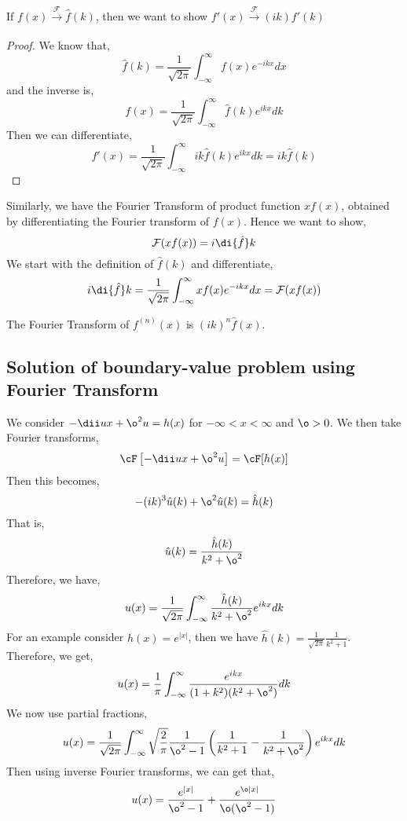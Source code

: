 \begin{nthm}[]
  If $f(x) \xrightarrow[]{\mathcal{F}} \hat f(k)$, then we want to show $f'(x) \xrightarrow[]{\mathcal{F}} (ik)f'(k)$
\end{nthm}
\begin{proof}
  We know that,
  $$ \hat f(k) = \frac{1}{\sqrt{2\pi}}\int_{-\infty}^\infty f(x)e^{-ikx}dx $$
  and the inverse is,
  $$ f(x) = \frac{1}{\sqrt{2\pi}}\int_{-\infty}^\infty \hat f(k)e^{ikx}dk $$
  Then we can differentiate,
  $$ f'(x) = \frac{1}{\sqrt{2\pi}}\int_{-\infty}^\infty  ik\hat f(k)e^{ikx}dk = ik\hat f(k)$$
\end{proof}

\noindent
Similarly, we have the Fourier Transform of product function $xf(x)$, obtained by differentiating the Fourier transform of $f(x)$. Hence we want to show,
$$ \mathcal{F}(xf(x)) = i \di {\hat f} k $$
We start with the definition of $\hat f(k)$ and differentiate,
$$ i\di {\hat f} k = \frac{1}{\sqrt{2\pi}}\int_{-\infty}^\infty xf(x)e^{-ikx}dx = \mathcal{F}(xf(x)) $$
\begin{ncor}
   The Fourier Transform of $f^{(n)}(x)$ is $(ik)^n \hat f(x)$.
\end{ncor}

\subsection{Solution of boundary-value problem using Fourier Transform}
We consider $-\dii u x + \o^2 u = h(x)$ for $-\infty < x < \infty$ and $\o > 0$. We then take Fourier transforms,
$$ \cF \left[ -\dii u x + \o^2 u \right] = \cF [h(x)] $$
Then this becomes,
$$ -(ik)^3\hat u(k) + \o^2\hat u(k) = \hat h(k) $$
That is,
$$ \hat u(k) = \frac{\hat h (k)}{k^2 + \o^2} $$
Therefore, we have,
$$ u(x) = \frac{1}{\sqrt{2\pi}}\int_{-\infty}^\infty \frac{\hat h(k)}{k^2 + \o^2}e^{ikx}dk $$
For an example consider $h(x) = e^{|x|}$, then we have $\hat h(k) = \frac{1}{\sqrt{2\pi}} \frac{1}{k^2 + 1}$. Therefore, we get,
$$ u(x) = \frac{1}{\pi}\int_{-\infty}^\infty \frac{e^{ikx}}{(1 + k^2)(k^2 + \o^2)}dk $$
We now use partial fractions,
$$  u(x) = \frac{1}{\sqrt{2\pi}}\int_{-\infty}^\infty \sqrt{\frac{2}{\pi}} \frac{1}{\o^2 - 1}\left( \frac{1}{k^2 + 1} - \frac{1}{k^2 + \o^2} \right)e^{ikx}dk $$
Then using inverse Fourier transforms, we can get that,
$$ u(x) = \frac{e^{|x|}}{\o^2 - 1} + \frac{e^{\o|x|}}{\o(\o^2 - 1)} $$

